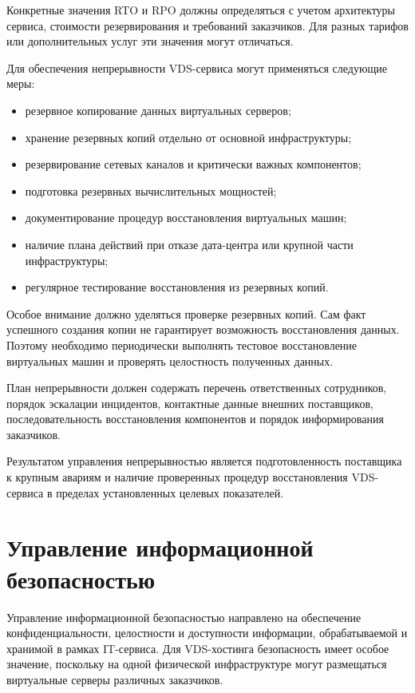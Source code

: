 \documentclass[14pt,a4paper]{extarticle}
\begin{document}
Конкретные значения RTO и RPO должны определяться с учетом архитектуры сервиса,
стоимости резервирования и требований заказчиков. Для разных тарифов или
дополнительных услуг эти значения могут отличаться.

Для обеспечения непрерывности VDS-сервиса могут применяться следующие меры:
\begin{itemize}
    \item резервное копирование данных виртуальных серверов;
    \item хранение резервных копий отдельно от основной инфраструктуры;
    \item резервирование сетевых каналов и критически важных компонентов;
    \item подготовка резервных вычислительных мощностей;
    \item документирование процедур восстановления виртуальных машин;
    \item наличие плана действий при отказе дата-центра или крупной части
    инфраструктуры;
    \item регулярное тестирование восстановления из резервных копий.
\end{itemize}

Особое внимание должно уделяться проверке резервных копий. Сам факт успешного
создания копии не гарантирует возможность восстановления данных. Поэтому
необходимо периодически выполнять тестовое восстановление виртуальных машин и
проверять целостность полученных данных.

План непрерывности должен содержать перечень ответственных сотрудников, порядок
эскалации инцидентов, контактные данные внешних поставщиков, последовательность
восстановления компонентов и порядок информирования заказчиков.

Результатом управления непрерывностью является подготовленность поставщика к
крупным авариям и наличие проверенных процедур восстановления VDS-сервиса в
пределах установленных целевых показателей.

\section{Управление информационной безопасностью}

Управление информационной безопасностью направлено на обеспечение
конфиденциальности, целостности и доступности информации, обрабатываемой и
хранимой в рамках IT-сервиса. Для VDS-хостинга безопасность имеет особое значение,
поскольку на одной физической инфраструктуре могут размещаться виртуальные
серверы различных заказчиков.
\end{document}
